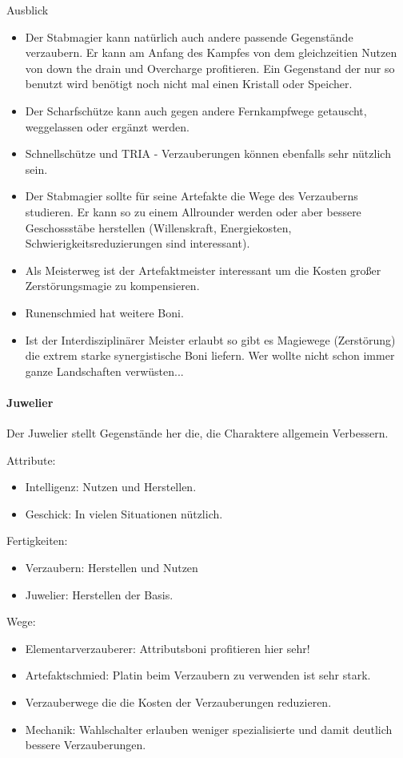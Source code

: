 \documentclass{article}
\begin{document}
Ausblick
\begin{itemize}
\item Der Stabmagier kann natürlich auch andere passende Gegenstände verzaubern. Er kann am Anfang des Kampfes von dem gleichzeitien Nutzen von down the drain und Overcharge profitieren. Ein Gegenstand der nur so benutzt wird benötigt noch nicht mal einen Kristall oder Speicher.
\item Der Scharfschütze kann auch gegen andere Fernkampfwege getauscht, weggelassen oder ergänzt werden.
\item Schnellschütze und TRIA - Verzauberungen können ebenfalls sehr nützlich sein.
\item Der Stabmagier sollte für seine Artefakte die Wege des Verzauberns studieren. Er kann so zu einem Allrounder werden oder aber bessere Geschossstäbe herstellen (Willenskraft, Energiekosten, Schwierigkeitsreduzierungen sind interessant).
\item Als Meisterweg ist der Artefaktmeister interessant um die Kosten großer Zerstörungsmagie zu kompensieren.
\item Runenschmied hat weitere Boni.
\item Ist der Interdisziplinärer Meister erlaubt so gibt es Magiewege (Zerstörung) die extrem starke synergistische Boni liefern. Wer wollte nicht schon immer ganze Landschaften verwüsten...
\end{itemize}

\paragraph{Juwelier}
Der Juwelier stellt Gegenstände her die, die Charaktere allgemein Verbessern.

Attribute:
\begin{itemize}
\item Intelligenz: Nutzen und Herstellen.
\item Geschick: In vielen Situationen nützlich.
\end{itemize}

Fertigkeiten:
\begin{itemize}
\item Verzaubern: Herstellen und Nutzen
\item Juwelier: Herstellen der Basis.
\end{itemize}

Wege:
\begin{itemize}
\item Elementarverzauberer: Attributsboni profitieren hier sehr!
\item Artefaktschmied: Platin beim Verzaubern zu verwenden ist sehr stark.
\item Verzauberwege die die Kosten der Verzauberungen reduzieren.
\item Mechanik: Wahlschalter erlauben weniger spezialisierte und damit deutlich bessere Verzauberungen.
\end{itemize}
\end{document}
